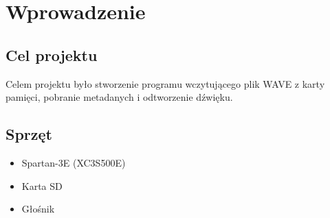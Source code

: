 \documentclass{article}
\begin{document}

\newpage
\section{Wprowadzenie}
\subsection{Cel projektu}
\par Celem projektu było stworzenie programu wczytującego plik WAVE z karty pamięci, pobranie metadanych i odtworzenie dźwięku.
\subsection{Sprzęt}
\begin{itemize}
	\item{Spartan-3E (XC3S500E)}
	\item{Karta SD}
	\item{Głośnik}
\end{itemize}
\end{document}
